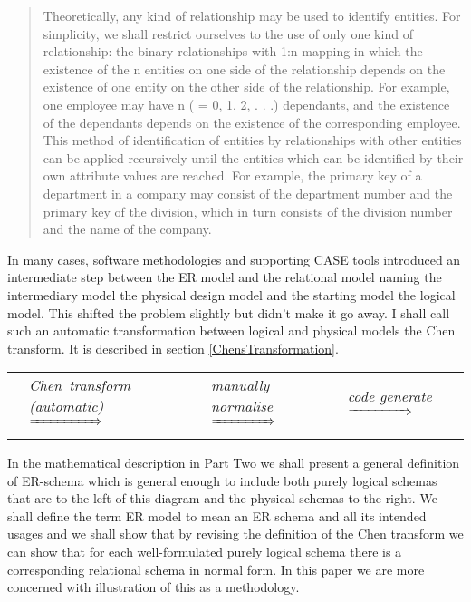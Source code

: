 \documentclass[10pt,a4paper]{article}
\begin{document}
\begin{quote}
Theoretically, any kind of relationship may be used to identify entities. For
simplicity, we shall restrict ourselves to the use of only one kind of relationship:
the binary relationships with 1:n mapping in which the existence of the n entities
on one side of the relationship depends on the existence of one entity on the other
side of the relationship. For example, one employee may have n ( = 0, 1, 2, . . .)
dependants, and the existence of the dependants depends on the existence of the
corresponding employee.
This method of identification of entities by relationships with other entities can
be applied recursively until the entities which can be identified by their own attribute
values are reached. For example, the primary key of a department in a
company may consist of the department number and the primary key of the
division, which in turn consists of the division number and the name of the company.
\end{quote}

\noindent In many cases, software methodologies and supporting CASE tools introduced an intermediate step between the ER model and the relational model naming the intermediary model the physical design model and the starting model the logical
model. This shifted the problem slightly but didn't make it go away. I shall call such an automatic transformation 
between logical and physical models the Chen transform. It is described in section \ref{ChensTransformation}.  
\begin{center}
\setlength{\tabcolsep}{2pt}
\begin{tabular}{ p{1.4cm}  p{2.2cm}  p{1.5cm} p{1.5cm} p{1.5cm} p{1.5cm}  p{1.25cm}}
\raisebox{-0.8cm}{\parbox{1.4cm}{logical er~schema}}& \textit{Chen~transform (automatic)} $\xRightarrow{\hspace*{1.75cm}}$ &
\raisebox{-0.8cm}{\parbox{1.4cm}{physical er schema}}& \textit{manually normalise} $\xRightarrow{\hspace*{1.5cm}}$ &
\raisebox{-0.8cm}{\parbox{1.4cm}{physical er schema}}& \textit{code generate} $\xRightarrow{\hspace*{1.5cm}}$ &  \raisebox{-0.8cm}{\parbox{1.25cm}{relational schema}} 
\end{tabular}
\end{center}
\vspace{0.2cm}

\noindent In the mathematical description in Part Two we shall present a general definition of ER-schema which is general enough to include both purely logical schemas that are  to the left of this diagram and the physical schemas to the right. We shall define the term ER model to mean an ER schema and all its intended usages and we shall show that by revising the definition of the Chen transform we can show that for each well-formulated purely logical schema there is a corresponding relational schema in normal form. In this paper we are more concerned with illustration of this as a methodology. \\ 
\end{document}
